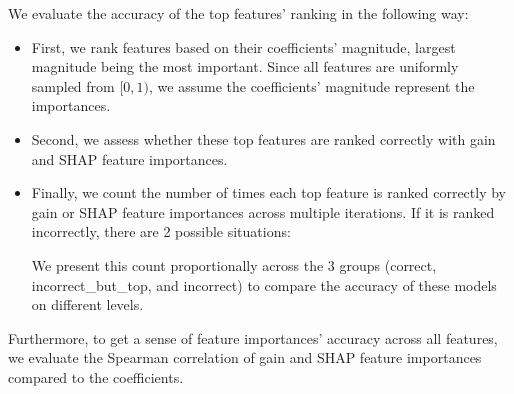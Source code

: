 We evaluate the accuracy of the top features' ranking in the following way:
\begin{itemize}
    \item First, we rank features based on their coefficients' magnitude, largest magnitude being the most important. Since all features are uniformly sampled from $[0, 1)$, we assume the coefficients' magnitude represent the importances. 
    \item Second, we assess whether these top features are ranked correctly with gain and SHAP feature importances. 
    \item Finally, we count the number of times each top feature is ranked correctly by gain or SHAP feature importances across multiple iterations. If it is ranked incorrectly, there are 2 possible situations: 
    We present this count proportionally across the 3 groups (correct, incorrect\_but\_top, and incorrect) to compare the accuracy of these models on different levels.
\end{itemize} 
Furthermore, to get a sense of feature importances' accuracy across all features, we evaluate the Spearman correlation of gain and SHAP feature importances compared to the coefficients.

